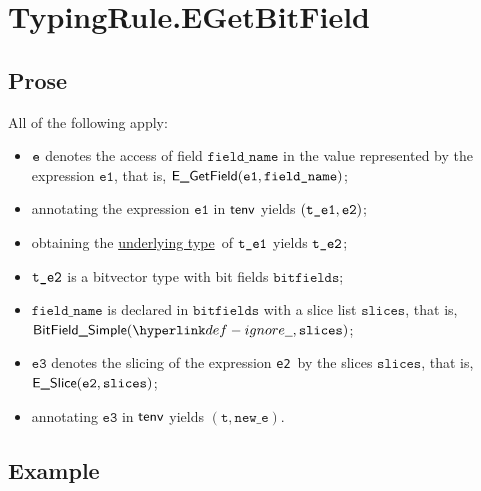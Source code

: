 \documentclass{book}
\newcommand\ProseOrTypeError[0]{\ProseTerminateAs{\TypeErrorConfig}}
\newcommand\underlyingtype[0]{\hyperlink{def-underlyingtype}{underlying type}}
\newcommand\vt[0]{\texttt{t}}
\newcommand\veone[0]{\texttt{e1}}
\newcommand\vetwo[0]{\texttt{e2}}
\newcommand\vethree[0]{\texttt{e3}}
\newcommand\bitfields[0]{\texttt{bitfields}}
\newcommand\fieldname[0]{\texttt{field\_name}}
\newcommand\slices[0]{\texttt{slices}}
\newcommand\newe[0]{\texttt{new\_e}}
\begin{document}

\section{TypingRule.EGetBitField \label{sec:TypingRule.EGetBitField}}

\subsection{Prose}
All of the following apply:
\begin{itemize}
  \item $\texttt{e}$ denotes the access of field $\fieldname$ in the value represented by the expression $\veone$, that is, $\EGetField(\veone, \fieldname)$;
  \item annotating the expression $\veone$ in $\textsf{tenv}$ yields $(\vteone, \vetwo)$\ProseOrTypeError;
  \item obtaining the \underlyingtype\ of $\texttt{t\_e1}$ yields $\texttt{t\_e2}$\ProseOrTypeError;
  \item $\texttt{t\_e2}$ is a bitvector type with bit fields $\bitfields$;
  \item $\fieldname$ is declared in $\bitfields$ with a slice list $\slices$, that is, \\ $\BitFieldSimple(\Ignore, \slices)$;
  \item $\vethree$ denotes the slicing of the expression \vetwo\ by the slices $\slices$, that is, \\ $\ESlice(\vetwo, \slices)$;
  \item annotating $\vethree$ in $\textsf{tenv}$ yields $(\vt, \newe)$\ProseOrTypeError.
\end{itemize}

\subsection{Example}

\end{document}
